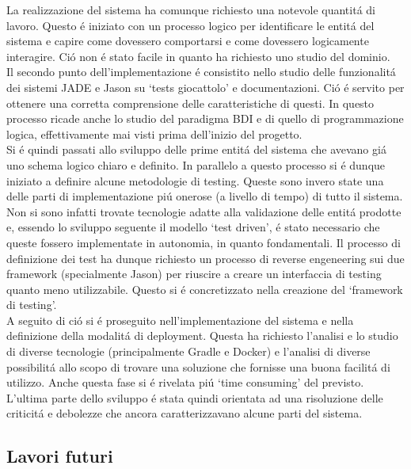 \parag
La realizzazione del sistema ha comunque richiesto una notevole quantit\'a di lavoro. Questo \'e iniziato con un processo logico per identificare le entit\'a del sistema e capire come dovessero comportarsi e come dovessero logicamente interagire. Ci\'o non \'e stato facile in quanto ha richiesto uno studio del dominio.\\
Il secondo punto dell'implementazione \'e consistito nello studio delle funzionalit\'a dei sistemi JADE e Jason su `tests giocattolo' e documentazioni. Ci\'o \'e servito per ottenere una corretta comprensione delle caratteristiche di questi. In questo processo ricade anche lo studio del paradigma BDI e di quello di programmazione logica, effettivamente mai visti prima dell'inizio del progetto.\\
Si \'e quindi passati allo sviluppo delle prime entit\'a del sistema che avevano gi\'a uno schema logico chiaro e definito. In parallelo a questo processo si \'e dunque iniziato a definire alcune metodologie di testing. Queste sono invero state una delle parti di implementazione pi\'u onerose (a livello di tempo) di tutto il sistema. Non si sono infatti trovate tecnologie adatte alla validazione delle entit\'a prodotte e, essendo lo sviluppo seguente il modello `test driven', \'e stato necessario che queste fossero implementate in autonomia, in quanto fondamentali. Il processo di definizione dei test ha dunque richiesto un processo di reverse engeneering sui due framework (specialmente Jason) per riuscire a creare un interfaccia di testing quanto meno utilizzabile. Questo si \'e concretizzato nella creazione del `framework di testing'.\\
A seguito di ci\'o si \'e proseguito nell'implementazione del sistema e nella definizione della modalit\'a di deployment. Questa ha richiesto l'analisi e lo studio di diverse tecnologie (principalmente Gradle e Docker) e l'analisi di diverse possibilit\'a allo scopo di trovare una soluzione che fornisse una buona facilit\'a di utilizzo. Anche questa fase si \'e rivelata pi\'u `time consuming' del previsto.\\
L'ultima parte dello sviluppo \'e stata quindi orientata ad una risoluzione delle criticit\'a e debolezze che ancora caratterizzavano alcune parti del sistema.

\subsection{Lavori futuri}

